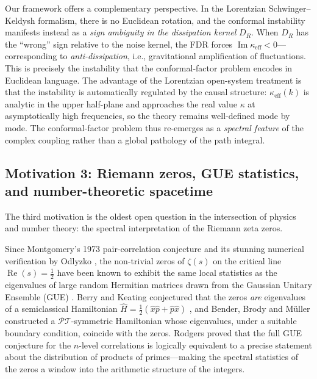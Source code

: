\documentclass[12pt,a4paper]{article}
\begin{document}
Our framework offers a complementary perspective.
In the Lorentzian Schwinger--Keldysh formalism, there is no Euclidean rotation, and the conformal instability manifests instead as a \emph{sign ambiguity in the dissipation kernel} $D_{R}$.
When $D_{R}$ has the ``wrong'' sign relative to the noise kernel, the FDR forces $\operatorname{Im}\kappa_{\mathrm{eff}}<0$---corresponding to \emph{anti-dissipation}, i.e., gravitational amplification of fluctuations.
This is precisely the instability that the conformal-factor problem encodes in Euclidean language.
The advantage of the Lorentzian open-system treatment is that the instability is automatically regulated by the causal structure: $\kappa_{\mathrm{eff}}(k)$ is analytic in the upper half-plane and approaches the real value $\kappa$ at asymptotically high frequencies, so the theory remains well-defined mode by mode.
The conformal-factor problem thus re-emerges as a \emph{spectral feature} of the complex coupling rather than a global pathology of the path integral.


\subsection{Motivation 3: Riemann zeros, GUE statistics, and number-theoretic spacetime}\label{sec:mot3}

The third motivation is the oldest open question in the intersection of physics and number theory: the spectral interpretation of the Riemann zeta zeros.

Since Montgomery's 1973 pair-correlation conjecture \cite{Montgomery1973} and its stunning numerical verification by Odlyzko \cite{Odlyzko1987}, the non-trivial zeros of $\zeta(s)$ on the critical line $\operatorname{Re}(s)=\tfrac{1}{2}$ have been known to exhibit the same local statistics as the eigenvalues of large random Hermitian matrices drawn from the Gaussian Unitary Ensemble (GUE) \cite{MontgomeryWiki,MathWorldMontgomery}.
Berry and Keating conjectured that the zeros \emph{are} eigenvalues of a semiclassical Hamiltonian $\hat{H}=\tfrac{1}{2}(\hat{x}\hat{p}+\hat{p}\hat{x})$ \cite{BerryKeating1999}, and Bender, Brody and M\"uller \cite{BBM2017} constructed a $\mathcal{PT}$-symmetric Hamiltonian whose eigenvalues, under a suitable boundary condition, coincide with the zeros.
Rodgers proved \cite{Rodgers2013} that the full GUE conjecture for the $n$-level correlations is logically equivalent to a precise statement about the distribution of products of primes---making the spectral statistics of the zeros a window into the arithmetic structure of the integers.
\end{document}
